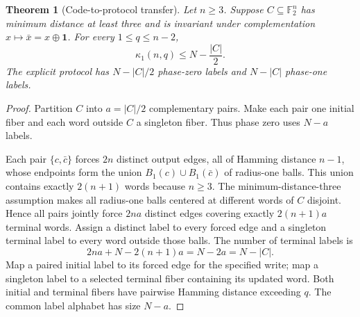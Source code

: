 \documentclass[11pt,a4paper]{article}
\newtheorem{theorem}{Theorem}[section]
\newcommand{\F}{\mathbb F_2}
\begin{document}
\begin{theorem}[Code-to-protocol transfer]\label{thm:v3transfer}
Let $n\ge3$. Suppose $C\subseteq\F^n$ has minimum distance at least three and is invariant under complementation $x\mapsto\bar x=x\oplus\mathbf1$. For every $1\le q\le n-2$,
\[
 \boxed{\quad\kappa_1(n,q)\le N-\frac{|C|}{2}.\quad}
\]
The explicit protocol has $N-|C|/2$ phase-zero labels and $N-|C|$ phase-one labels.
\end{theorem}
\begin{proof}
Partition $C$ into $a=|C|/2$ complementary pairs. Make each pair one initial fiber and each word outside $C$ a singleton fiber. Thus phase zero uses $N-a$ labels.

Each pair $\{c,\bar c\}$ forces $2n$ distinct output edges, all of Hamming distance $n-1$, whose endpoints form the union $B_1(c)\cup B_1(\bar c)$ of radius-one balls. This union contains exactly $2(n+1)$ words because $n\ge3$. The minimum-distance-three assumption makes all radius-one balls centered at different words of $C$ disjoint. Hence all pairs jointly force $2na$ distinct edges covering exactly $2(n+1)a$ terminal words. Assign a distinct label to every forced edge and a singleton terminal label to every word outside those balls. The number of terminal labels is
\[
 2na+N-2(n+1)a=N-2a=N-|C|.
\]
Map a paired initial label to its forced edge for the specified write; map a singleton label to a selected terminal fiber containing its updated word. Both initial and terminal fibers have pairwise Hamming distance exceeding $q$. The common label alphabet has size $N-a$.
\end{proof}
\end{document}
